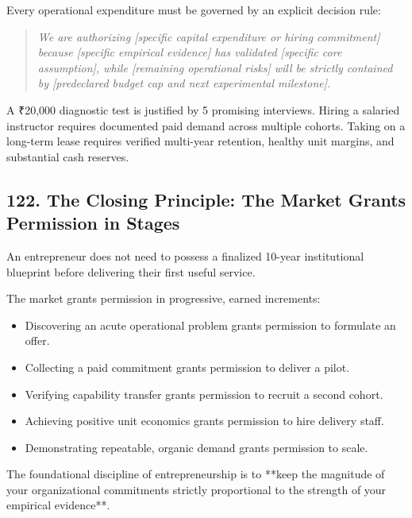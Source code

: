 Every operational expenditure must be governed by an explicit decision rule:

\begin{quote}
\emph{We are authorizing [specific capital expenditure or hiring commitment] because [specific empirical evidence] has validated [specific core assumption], while [remaining operational risks] will be strictly contained by [predeclared budget cap and next experimental milestone].}
\end{quote}

A ₹20,000 diagnostic test is justified by 5 promising interviews. Hiring a salaried instructor requires documented paid demand across multiple cohorts. Taking on a long-term lease requires verified multi-year retention, healthy unit margins, and substantial cash reserves.

\subsection*{122. The Closing Principle: The Market Grants Permission in Stages}

An entrepreneur does not need to possess a finalized 10-year institutional blueprint before delivering their first useful service.

The market grants permission in progressive, earned increments:
\begin{itemize}
    \item Discovering an acute operational problem grants permission to formulate an offer.
    \item Collecting a paid commitment grants permission to deliver a pilot.
    \item Verifying capability transfer grants permission to recruit a second cohort.
    \item Achieving positive unit economics grants permission to hire delivery staff.
    \item Demonstrating repeatable, organic demand grants permission to scale.
\end{itemize}

The foundational discipline of entrepreneurship is to **keep the magnitude of your organizational commitments strictly proportional to the strength of your empirical evidence**.
